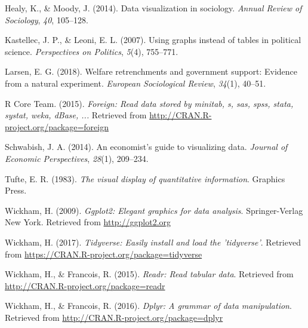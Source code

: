 \documentclass[12pt,oneside]{reedthesis}
\theoremstyle{definition}
\theoremstyle{definition}
\theoremstyle{definition}
\theoremstyle{remark}
\begin{document}
  \hypertarget{ref-healymoody2014}{}
  Healy, K., \& Moody, J. (2014). Data visualization in sociology.
  \emph{Annual Review of Sociology}, \emph{40}, 105--128.
  
  \hypertarget{ref-kastellecleoni2007}{}
  Kastellec, J. P., \& Leoni, E. L. (2007). Using graphs instead of tables
  in political science. \emph{Perspectives on Politics}, \emph{5}(4),
  755--771.
  
  \hypertarget{ref-larsen2018}{}
  Larsen, E. G. (2018). Welfare retrenchments and government support:
  Evidence from a natural experiment. \emph{European Sociological Review},
  \emph{34}(1), 40--51.
  
  \hypertarget{ref-rcoreteam2015foreign}{}
  R Core Team. (2015). \emph{Foreign: Read data stored by minitab, s, sas,
  spss, stata, systat, weka, dBase, ...} Retrieved from
  \url{http://CRAN.R-project.org/package=foreign}
  
  \hypertarget{ref-schwabish2014}{}
  Schwabish, J. A. (2014). An economist's guide to visualizing data.
  \emph{Journal of Economic Perspectives}, \emph{28}(1), 209--234.
  
  \hypertarget{ref-tufte1983}{}
  Tufte, E. R. (1983). \emph{The visual display of quantitative
  information}. Graphics Press.
  
  \hypertarget{ref-wickham2009}{}
  Wickham, H. (2009). \emph{Ggplot2: Elegant graphics for data analysis}.
  Springer-Verlag New York. Retrieved from \url{http://ggplot2.org}
  
  \hypertarget{ref-wickham2017}{}
  Wickham, H. (2017). \emph{Tidyverse: Easily install and load the
  'tidyverse'}. Retrieved from
  \url{https://CRAN.R-project.org/package=tidyverse}
  
  \hypertarget{ref-wickhamfrancois2015}{}
  Wickham, H., \& Francois, R. (2015). \emph{Readr: Read tabular data}.
  Retrieved from \url{http://CRAN.R-project.org/package=readr}
  
  \hypertarget{ref-wickhamfrancois2016}{}
  Wickham, H., \& Francois, R. (2016). \emph{Dplyr: A grammar of data
  manipulation}. Retrieved from
  \url{http://CRAN.R-project.org/package=dplyr}


\end{document}
